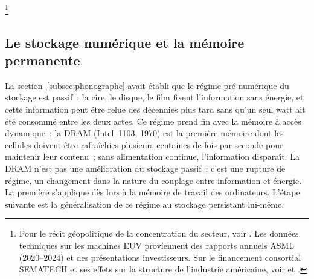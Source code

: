 
\footnote{Pour le récit géopolitique de la concentration du secteur, voir \textcite{miller_chip_2022}. Les données techniques sur les machines EUV proviennent des rapports annuels ASML (2020--2024) et des présentations investisseurs. Sur le financement consortial SEMATECH et ses effets sur la structure de l'industrie américaine, voir \textcite{irwin_learning_1994} et \textcite{flamm_targeting_1987}.}


\subsection{Le stockage numérique et la mémoire permanente}\label{subsec:store}

%
La section~\ref{subsec:phonographe} avait établi que le régime pré-numérique du stockage est passif~: la cire, le disque, le film fixent l'information sans énergie, et cette information peut être relue des décennies plus tard sans qu'un seul watt ait été consommé entre les deux actes. Ce régime prend fin avec la mémoire à accès dynamique~: la DRAM (Intel~1103, 1970) est la première mémoire dont les cellules doivent être rafraîchies plusieurs centaines de fois par seconde pour maintenir leur contenu~; sans alimentation continue, l'information disparaît. La DRAM n'est pas une amélioration du stockage passif~: c'est une rupture de régime, un changement dans la nature du couplage entre information et énergie. La première s'applique dès lors à la mémoire de travail des ordinateurs. L'étape suivante est la généralisation de ce régime au stockage persistant lui-même.


